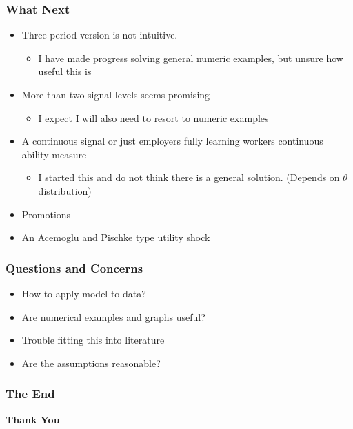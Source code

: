 \documentclass{beamer}
\begin{document}

\begin{frame}
\frametitle{What Next}
\begin{itemize}
	\setlength{\itemsep}{5mm}
	\item Three period version is not intuitive. 
	\begin{itemize}
		\item I have made progress solving general numeric examples, but unsure how useful this is
	\end{itemize}
	\item More than two signal levels seems promising
	\begin{itemize}
		\item  I expect I will also need to resort to numeric examples 
	\end{itemize} 
	\item A continuous signal or just employers fully learning workers continuous ability measure 
	\begin{itemize}
		\item I started this and do not think there is a general solution. (Depends on $\theta$ distribution)
	\end{itemize}
	\item Promotions
	\item An Acemoglu and Pischke type utility shock 
\end{itemize}
\end{frame}

\begin{frame}
\frametitle{Questions and Concerns }
\begin{itemize}
	\setlength{\itemsep}{5mm}
	\item How to apply model to data?
	\item Are numerical examples and graphs useful?
	\item Trouble fitting this into literature 
	\item Are the assumptions reasonable? 
	
\end{itemize}
\end{frame}



\begin{frame}

\frametitle{The End }

\begin{center}
	
\begin{Huge}
\textbf{Thank You}
\end{Huge}
\end{center}
\end{frame}

\end{document}

